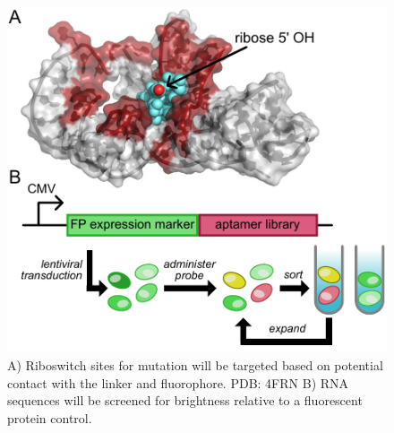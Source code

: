 \begin{figure}
\begin{centering}
\includegraphics[width=\textwidth]{figures/aim2.pdf}

\end{centering}
\footnotesize
\caption{\label{figure:aim2}
A) Riboswitch sites for mutation will be targeted based on potential contact with the linker and fluorophore. PDB: 4FRN\cite{JohnsonJrB12cofactorsdirectly2012} B) RNA sequences will be screened for brightness relative to a fluorescent protein control.
}
\end{figure}

